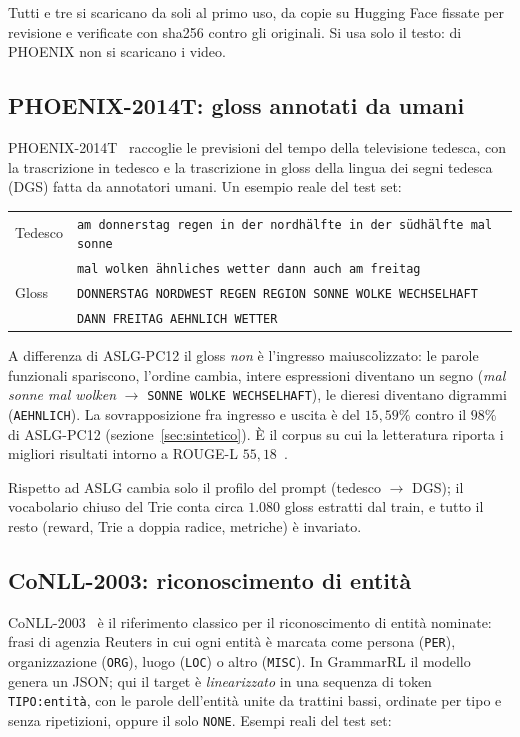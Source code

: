 Tutti e tre si scaricano da soli al primo uso, da copie su Hugging Face fissate
per revisione e verificate con sha256 contro gli originali. Si usa solo il testo:
di PHOENIX non si scaricano i video.

\subsection{PHOENIX-2014T: gloss annotati da umani}

PHOENIX-2014T~\cite{camgoz2018phoenix} raccoglie le previsioni del tempo della
televisione tedesca, con la trascrizione in tedesco e la trascrizione in gloss
della lingua dei segni tedesca (DGS) fatta da annotatori umani. Un esempio reale
del test set:

\begin{center}
\small
\begin{tabular}{ll}
\toprule
Tedesco & \texttt{am donnerstag regen in der nordhälfte in der südhälfte mal sonne} \\
        & \texttt{mal wolken ähnliches wetter dann auch am freitag} \\
Gloss   & \texttt{DONNERSTAG NORDWEST REGEN REGION SONNE WOLKE WECHSELHAFT} \\
        & \texttt{DANN FREITAG AEHNLICH WETTER} \\
\bottomrule
\end{tabular}
\end{center}

A differenza di ASLG-PC12 il gloss \emph{non} è l'ingresso maiuscolizzato: le
parole funzionali spariscono, l'ordine cambia, intere espressioni diventano un
segno (\emph{mal sonne mal wolken} $\to$ \texttt{SONNE WOLKE WECHSELHAFT}),
le dieresi diventano digrammi (\texttt{AEHNLICH}). La sovrapposizione
fra ingresso e uscita è del $15{,}59\%$ contro il $98\%$ di ASLG-PC12
(sezione~\ref{sec:sintetico}). È il corpus su cui la letteratura riporta i
migliori risultati intorno a ROUGE-L $55{,}18$~\cite{ouargani2023t2g}.

Rispetto ad ASLG cambia solo il profilo del prompt (tedesco $\to$ DGS); il
vocabolario chiuso del Trie conta circa $1.080$ gloss estratti dal train, e
tutto il resto (reward, Trie a doppia radice, metriche) è invariato.

\subsection{CoNLL-2003: riconoscimento di entità}

CoNLL-2003~\cite{tjongkimsang2003conll} è il riferimento classico per il
riconoscimento di entità nominate: frasi di agenzia Reuters in cui ogni entità è
marcata come persona (\texttt{PER}), organizzazione (\texttt{ORG}), luogo
(\texttt{LOC}) o altro (\texttt{MISC}). In GrammarRL il modello genera un JSON;
qui il target è \emph{linearizzato} in una sequenza di token \texttt{TIPO:entità},
con le parole dell'entità unite da trattini bassi, ordinate per tipo e senza
ripetizioni, oppure il solo \texttt{NONE}. Esempi reali del test set:

